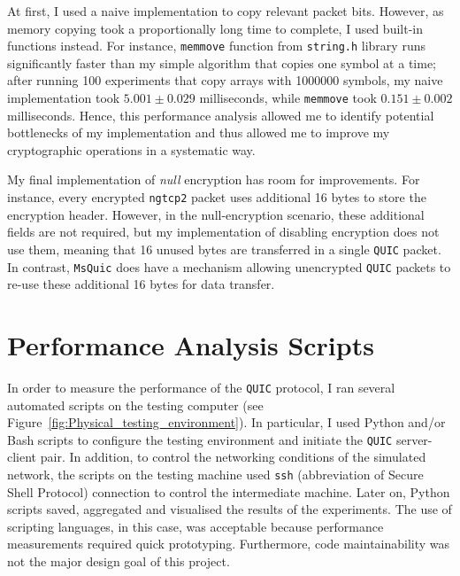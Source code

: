 \documentclass[12pt,a4paper]{report}
\begin{document}
At first, I used a naive implementation to copy relevant packet bits.
However, as memory copying took a proportionally long time to complete, I used built-in functions instead.
For instance, \texttt{memmove} function from \texttt{string.h} library runs significantly faster than my simple algorithm that copies one symbol at a time; after running 100 experiments that copy arrays with 1000000 symbols, my naive implementation took $5.001 \pm 0.029$ milliseconds, while \texttt{memmove} took $0.151 \pm 0.002$ milliseconds.
Hence, this performance analysis allowed me to identify potential bottlenecks of my implementation and thus allowed me to improve my cryptographic operations in a systematic way.





My final implementation of \textit{null} encryption has room for improvements.
For instance, every encrypted \texttt{ngtcp2} packet uses additional 16 bytes to store the encryption header.
However, in the null-encryption scenario, these additional fields are not required, but my implementation of disabling encryption does not use them, meaning that 16 unused bytes are transferred in a single \texttt{QUIC} packet.
In contrast, \texttt{MsQuic} does have a mechanism allowing unencrypted \texttt{QUIC} packets to re-use these additional 16 bytes for data transfer.



\section{Performance Analysis Scripts}

In order to measure the performance of the \texttt{QUIC} protocol, I ran several automated scripts on the testing computer (see Figure~\ref{fig:Physical_testing_environment}).
In particular, I used Python and/or Bash scripts to configure the testing environment and initiate the \texttt{QUIC} server-client pair.
In addition, to control the networking conditions of the simulated network, the scripts on the testing machine used \texttt{ssh} (abbreviation of Secure Shell Protocol) connection to control the intermediate machine.
Later on, Python scripts saved, aggregated and visualised the results of the experiments.
The use of scripting languages, in this case, was acceptable because performance measurements required quick prototyping.
Furthermore, code maintainability was not the major design goal of this project.
\end{document}
